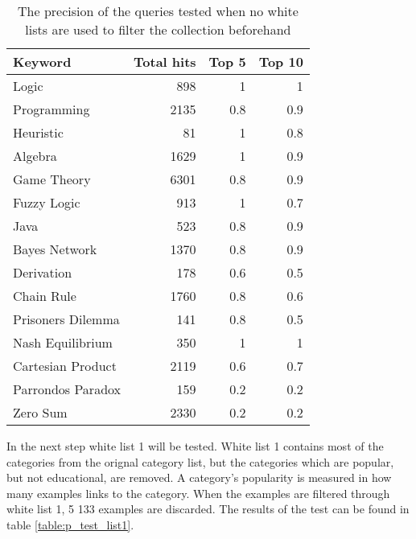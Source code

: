 \begin{table}[H]
\centering
\begin{tabular} {|| p{15em} | r | r | r ||} 
 \hline
 Keyword & Total hits & Top 5 & Top 10 \\ [0.5ex] 
 \hline

Logic & 898 & 1 & 1 \\
Programming & 2135 & 0.8 & 0.9 \\
Heuristic & 81 & 1 & 0.8 \\
Algebra & 1629 & 1 & 0.9 \\
Game Theory & 6301 & 0.8 & 0.9 \\
\hline
Fuzzy Logic & 913 & 1 & 0.7 \\
Java & 523 & 0.8 & 0.9 \\
Bayes Network & 1370 & 0.8 & 0.9 \\
Derivation & 178 & 0.6 & 0.5 \\
\hline
Chain Rule & 1760 & 0.8 & 0.6 \\
Prisoners Dilemma & 141 & 0.8 & 0.5 \\
Nash Equilibrium & 350 & 1 & 1 \\
Cartesian Product & 2119 & 0.6 & 0.7 \\
Parrondos Paradox & 159 & 0.2 & 0.2 \\
Zero Sum & 2330 & 0.2 & 0.2 \\

 \hline
\end{tabular}
\caption{The precision of the queries tested when no white lists are used to filter the collection beforehand}
\label{table:p_test_no-list}
\end{table}

In the next step white list 1 will be tested. White list 1 contains most of the categories from the orignal category list, but the categories which are popular, but not educational, are removed. A category's popularity is measured in how many examples links to the category. When the examples are filtered through white list 1, 5 133 examples are discarded. The results of the test can be found in table \ref{table:p_test_list1}.

